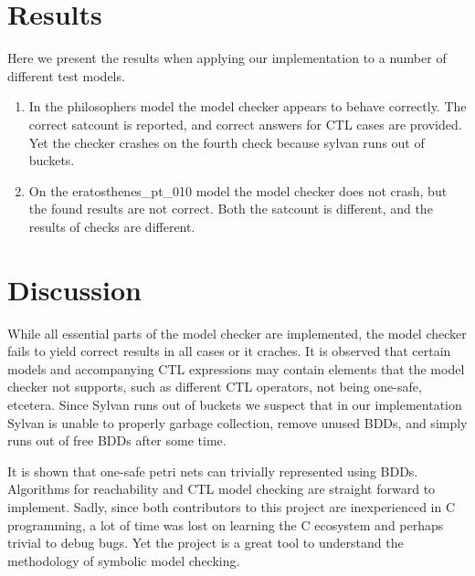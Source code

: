 \documentclass[twoside, a4paper]{article}
\begin{document}
\section{Results}
Here we present the results when applying our implementation to a number of different test models.
\begin{enumerate}
\item In the philosophers model the model checker appears to behave correctly. The correct satcount is reported, and correct answers for CTL cases are provided. Yet the checker crashes on the fourth check because sylvan runs out of buckets.
  \item On the eratosthenes\_pt\_010 model the model checker does not crash, but the found results are not correct. Both the satcount is different, and the results of checks are different.
\end{enumerate}
\section{Discussion}
While all essential parts of the model checker are implemented, the model checker fails to yield correct results in all cases or it craches. It is observed that certain models and accompanying CTL expressions may contain elements that the model checker not supports, such as different CTL operators, not being one-safe, etcetera. Since Sylvan runs out of buckets we suspect that in our implementation Sylvan is unable to properly garbage collection, remove unused BDDs, and simply runs out of free BDDs after some time.

It is shown that one-safe petri nets can trivially represented using BDDs. Algorithms for reachability and CTL model checking are straight forward to implement. Sadly, since both contributors to this project are inexperienced in C programming, a lot of time was lost on learning the C ecosystem and perhaps trivial to debug bugs. Yet the project is a great tool to understand the methodology of symbolic model checking.

\printbibliography
\end{document}
